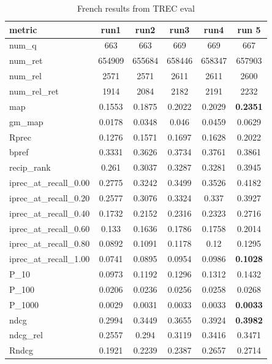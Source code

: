 
    \begin{table}[!h]
    \centering
    \begin{tabular}{ |l|c|c|c|c|c| }
        \hline
        metric & run1 & run2  & run3 & run4 &run 5 \\ \hline
        num\_q & 663 & 663 & 669 & 669 & 667 \\ \hline
        num\_ret & 654909 & 655684 & 658446 & 658347 & 657903 \\ \hline
        num\_rel & 2571 & 2571 & 2611 & 2611 & 2600 \\ \hline
        num\_rel\_ret & 1914 & 2084 & 2182 & 2191 & 2232 \\ \hline
        map & 0.1553 & 0.1875 & 0.2022 & 0.2029 & \textbf{0.2351} \\ \hline
        gm\_map & 0.0178 & 0.0348 & 0.046 & 0.0459 & 0.0629 \\ \hline
        Rprec & 0.1276 & 0.1571 & 0.1697 & 0.1628 & 0.2022 \\ \hline
        bpref & 0.3331 & 0.3626 & 0.3734 & 0.3761 & 0.3861 \\ \hline
        recip\_rank & 0.261 & 0.3037 & 0.3287 & 0.3281 & 0.3945 \\ \hline
        iprec\_at\_recall\_0.00 & 0.2775 & 0.3242 & 0.3499 & 0.3526 & 0.4182 \\ \hline
        iprec\_at\_recall\_0.20 & 0.2577 & 0.3076 & 0.3324 & 0.337 & 0.3927 \\ \hline
        iprec\_at\_recall\_0.40 & 0.1732 & 0.2152 & 0.2316 & 0.2323 & 0.2716 \\ \hline
        iprec\_at\_recall\_0.60 & 0.133 & 0.1636 & 0.1786 & 0.1758 & 0.2014 \\ \hline
        iprec\_at\_recall\_0.80 & 0.0892 & 0.1091 & 0.1178 & 0.12 & 0.1295 \\ \hline
        iprec\_at\_recall\_1.00 & 0.0741 & 0.0895 & 0.0954 & 0.0986 & \textbf{0.1028} \\ \hline
        P\_10 & 0.0973 & 0.1192 & 0.1296 & 0.1312 & 0.1432 \\ \hline
        P\_100 & 0.0206 & 0.0236 & 0.0256 & 0.0258 & 0.0268 \\ \hline
        P\_1000 & 0.0029 & 0.0031 & 0.0033 & 0.0033 & \textbf{0.0033} \\ \hline
        ndcg & 0.2994 & 0.3449 & 0.3655 & 0.3924 & \textbf{0.3982} \\ \hline
        ndcg\_rel & 0.2557 & 0.294 & 0.3119 & 0.3416 & 0.3471 \\ \hline
        Rndcg & 0.1921 & 0.2239 & 0.2387 & 0.2657 & 0.2714 \\ \hline
    \end{tabular}
    \label{table:french_r}
    \caption{French results from TREC eval}
\end{table}



